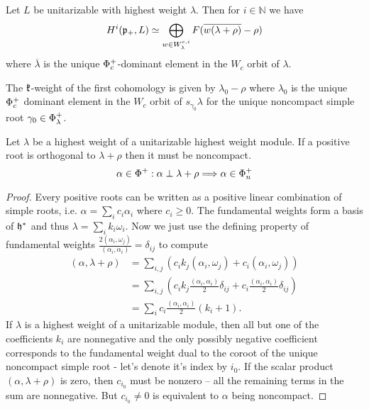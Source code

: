 \begin{theorem}\label{thm:cohomology}
 Let $L$ be unitarizable with highest weight $\lambda $. Then for $i\in \mathbb{N}$ we have
\[
 H^i(\mathfrak{p}_+,L)\simeq \bigoplus_{w\in W^{c,i}_\lambda} F(\overline{w(\lambda+\rho)} - \rho)
\]
where  $\overline{\lambda}$ is the unique $\Phi_c^+$-dominant element in the $W_c$ orbit of $\lambda$.
\end{theorem}

\begin{remark}
 The $\mathfrak{k}$-weight of the first cohomology is given by $\lambda_0-\rho$ where $\lambda_0$ is the unique $\Phi_c^+$ dominant element in the $W_c$ orbit of $s_{\gamma_0}\lambda$ for the unique noncompact simple root $\gamma_0 \in \Phi_\lambda^+$.
\end{remark}

\begin{lemma}\label{lem:singular_are_noncompact}
 Let $\lambda$ be a highest weight of a unitarizable highest weight module. If a positive root is orthogonal to $\lambda + \rho$ then it must be noncompact.
 \[
  \alpha \in \Phi^+: \alpha \perp \lambda + \rho \Longrightarrow \alpha \in \Phi^+_n
 \]
\end{lemma}
\begin{proof}
 Every positive roots can be written as a positive linear combination of simple roots, i.e. $\alpha = \sum_i c_i \alpha_i$ where $c_i \geq 0$. The fundamental weights form a basis of $\mathfrak{h}^*$ and thus $\lambda = \sum_i k_i \omega_i$. Now we just use the defining property of fundamental weights $\frac{2(\alpha_i,\omega_j)}{(\alpha_i,\alpha_i)} = \delta_{ij}$ to compute
 \begin{align*}
  (\alpha,\lambda+\rho) & = \sum_{i,j} \left(  c_i k_j (\alpha_i,\omega_j) + c_i (\alpha_i,\omega_j) \right ) \\
			& = \sum_{i,j} \left( c_i k_j \frac{(\alpha_i,\alpha_i)}{2} \delta_{ij} + c_i \frac{(\alpha_i,\alpha_i)}{2} \delta_{ij} \right ) \\
			& = \sum_i c_i \frac{(\alpha_i,\alpha_i)}{2} (k_i + 1).
 \end{align*}
 If $\lambda$ is a highest weight of a unitarizable module, then all but one of the coefficients $k_i$ are nonnegative and the only possibly negative coefficient corresponds to the fundamental weight dual to the coroot of the unique noncompact simple root - let's denote it's index by $i_0$. If the scalar product $(\alpha, \lambda+\rho)$ is zero, then $c_{i_0}$ must be nonzero -- all the remaining terms in the sum are nonnegative. But $c_{i_0} \neq 0$ is equivalent to $\alpha$ being noncompact.
\end{proof}


